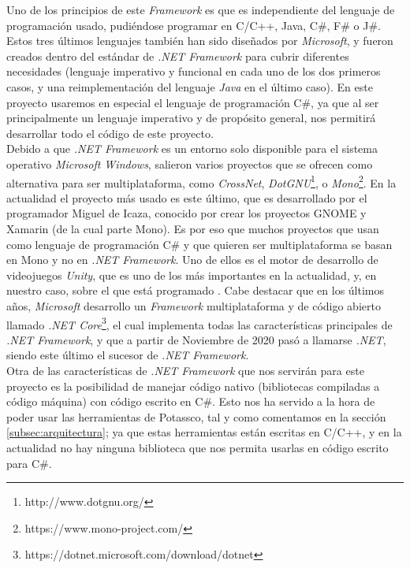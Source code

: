 Uno de los principios de este \textit{Framework} es que es independiente del lenguaje de programación usado, pudiéndose programar en C/C++, Java, C\#, F\# o J\#. Estos tres últimos lenguajes también han sido diseñados por \textit{Microsoft}, y fueron creados dentro del estándar de \textit{.NET Framework} para cubrir diferentes necesidades (lenguaje imperativo y funcional en cada uno de los dos primeros casos, y una reimplementación del lenguaje \textit{Java} en el último caso). En este proyecto usaremos en especial el lenguaje de programación C\#, ya que al ser principalmente un lenguaje imperativo y de propósito general, nos permitirá desarrollar todo el código de este proyecto. \\

Debido a que \textit{.NET Framework} es un entorno solo disponible para el sistema operativo \textit{Microsoft Windows}, salieron varios proyectos que se ofrecen como alternativa para ser multiplataforma, como \textit{CrossNet}, \textit{DotGNU}\footnote{http://www.dotgnu.org/}, o \textit{Mono}\footnote{https://www.mono-project.com/}. En la actualidad el proyecto más usado es este último, que es desarrollado por el programador Miguel de Icaza, conocido por crear los proyectos GNOME y Xamarin (de la cual parte Mono). Es por eso que muchos proyectos que usan como lenguaje de programación C\# y que quieren ser multiplataforma se basan en Mono y no en \textit{.NET Framework}. Uno de ellos es el motor de desarrollo de videojuegos \textit{Unity}, que es uno de los más importantes en la actualidad, y, en nuestro caso, sobre el que está programado \citiesit. Cabe destacar que en los últimos años, \textit{Microsoft} desarrollo un \textit{Framework} multiplataforma y de código abierto llamado \textit{.NET Core}\footnote{https://dotnet.microsoft.com/download/dotnet}, el cual implementa todas las características principales de \textit{.NET Framework}, y que a partir de Noviembre de 2020 pasó a llamarse \textit{.NET}, siendo este último el sucesor de \textit{.NET Framework}. \\

Otra de las características de \textit{.NET Framework} que nos servirán para este proyecto es la posibilidad de manejar código nativo (bibliotecas compiladas a código máquina) con código escrito en C\#. Esto nos ha servido a la hora de poder usar las herramientas de Potassco, tal y como comentamos en la sección \ref{subsec:arquitectura}; ya que estas herramientas están escritas en C/C++, y en la actualidad no hay ninguna biblioteca que nos permita usarlas en código escrito para C\#.

